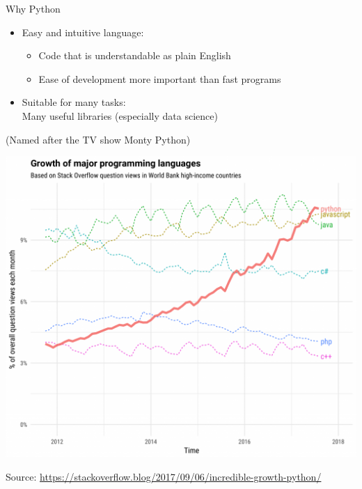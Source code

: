 \documentclass[aspectratio=169,usenames,dvipsnames]{beamer}
\begin{document}
\begin{frame}{Why Python}
    \begin{itemize}
        \item Easy and intuitive language:
            \begin{itemize}
                \item Code that is understandable as plain English
                \item Ease of development more important than fast programs
            \end{itemize}
        \item Suitable for many tasks:\\
            Many useful libraries (especially data science)
    \end{itemize}

    (Named after the TV show Monty Python)
\end{frame}

\begin{frame}

    \centering
    \includegraphics[height=0.9\textheight]{fig/pythongrowth.png}

    Source: \url{https://stackoverflow.blog/2017/09/06/incredible-growth-python/}
\end{frame}
\end{document}
